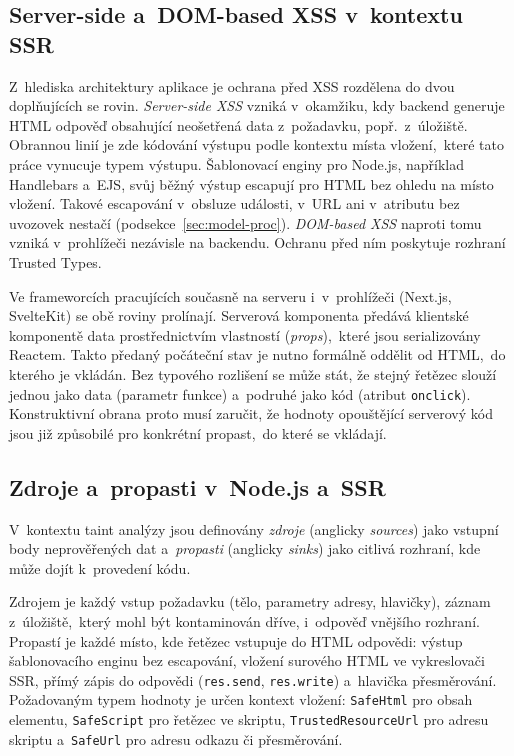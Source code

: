 \subsection{Server-side a~DOM-based XSS v~kontextu SSR}
\label{sec:server-vs-dom}

Z~hlediska architektury aplikace je ochrana před XSS rozdělena do dvou doplňujících se rovin. \emph{Server-side XSS} vzniká v~okamžiku, kdy backend generuje HTML odpověď obsahující neošetřená data z~požadavku, popř.~z~úložiště. Obrannou linií je zde kódování výstupu podle kontextu místa vložení,~které tato práce vynucuje typem výstupu. Šablonovací enginy pro Node.js, například Handlebars a~EJS, svůj běžný výstup escapují pro HTML bez ohledu na místo vložení. Takové escapování v~obsluze události, v~URL ani v~atributu bez uvozovek nestačí (podsekce~\ref{sec:model-proc}). \emph{DOM-based XSS} naproti tomu vzniká v~prohlížeči nezávisle na backendu. Ochranu před ním poskytuje rozhraní Trusted Types.

Ve frameworcích pracujících současně na serveru i~v~prohlížeči (Next.js, SvelteKit) se obě roviny prolínají. Serverová komponenta předává klientské komponentě data prostřednictvím vlastností (\emph{props}),~které jsou serializovány Reactem. Takto předaný počáteční stav je nutno formálně oddělit od HTML,~do kterého je vkládán. Bez typového rozlišení se může stát, že stejný řetězec slouží jednou jako data (parametr funkce) a~podruhé jako kód (atribut \texttt{onclick}). Konstruktivní obrana proto musí zaručit, že hodnoty opouštějící serverový kód jsou již způsobilé pro konkrétní propast,~do které se vkládají.

\subsection{Zdroje a~propasti v~Node.js a~SSR}

V~kontextu taint analýzy jsou definovány \emph{zdroje} (anglicky \emph{sources}) jako vstupní body neprověřených dat a~\emph{propasti} (anglicky \emph{sinks}) jako citlivá rozhraní, kde může dojít k~provedení kódu.

Zdrojem je každý vstup požadavku (tělo, parametry adresy, hlavičky), záznam z~úložiště,~který mohl být kontaminován dříve, i~odpověď vnějšího rozhraní. Propastí je každé místo, kde řetězec vstupuje do HTML odpovědi: výstup šablonovacího enginu bez escapování, vložení surového HTML ve vykreslovači SSR, přímý zápis do odpovědi (\texttt{res.send}, \texttt{res.write}) a~hlavička přesměrování. Požadovaným typem hodnoty je určen kontext vložení: \texttt{SafeHtml} pro obsah elementu, \texttt{SafeScript} pro řetězec ve skriptu, \texttt{TrustedResourceUrl} pro adresu skriptu a~\texttt{SafeUrl} pro adresu odkazu či přesměrování.

